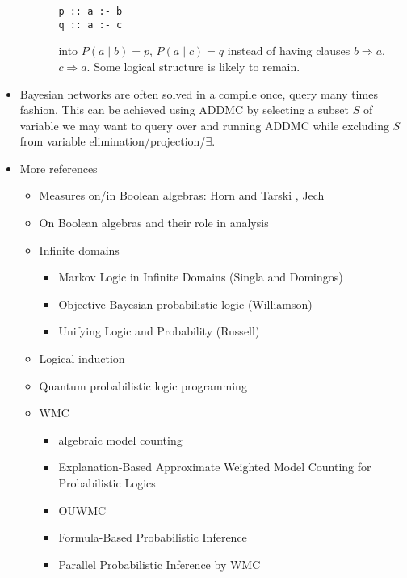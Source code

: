 \documentclass{article}
\theoremstyle{definition}
\theoremstyle{remark}
\begin{document}
\begin{itemize}
\begin{itemize}
\begin{itemize}
\begin{verbatim}
p :: a :- b
q :: a :- c
\end{verbatim}
      into $P(a \mid b)=p$, $P(a \mid c)=q$ instead of having clauses $b
      \Rightarrow a$, $c \Rightarrow a$. Some logical structure is likely to
      remain.
    \end{itemize}
  \end{itemize}
\item Bayesian networks are often solved in a compile once, query many times
  fashion. This can be achieved using ADDMC by selecting a subset $S$ of
  variable we may want to query over and running ADDMC while excluding $S$ from
  variable elimination/projection/$\exists$.
\item More references
  \begin{itemize}
  \item Measures on/in Boolean algebras: Horn and Tarski
    \cite{horn1948measures}, Jech \cite{jech2017measures}
  \item On Boolean algebras and their role in analysis \cite{winkowska1996boolean}
  \item Infinite domains
    \begin{itemize}
    \item Markov Logic in Infinite Domains (Singla and Domingos)
      \cite{DBLP:conf/uai/SinglaD07}
    \item Objective Bayesian probabilistic logic (Williamson)
      \cite{DBLP:journals/jal/Williamson08}
    \item Unifying Logic and Probability (Russell)
      \cite{DBLP:journals/cacm/Russell15}
    \end{itemize}
  \item Logical induction \cite{DBLP:journals/eccc/GarrabrantBCST16}
  \item Quantum probabilistic logic programming \cite{balu2015quantum}
  \item WMC
    \begin{itemize}
    \item algebraic model counting \cite{DBLP:journals/japll/KimmigBR17}
    \item Explanation-Based Approximate Weighted Model Counting for
      Probabilistic Logics \cite{DBLP:conf/aaai/RenkensKBR14}
    \item OUWMC \cite{DBLP:conf/aaai/Belle17}
    \item Formula-Based Probabilistic Inference \cite{DBLP:conf/uai/GogateD10}
    \item Parallel Probabilistic Inference by WMC \cite{DBLP:conf/pgm/DalLL18}

\end{itemize}
\end{itemize}
\end{itemize}
\end{document}
